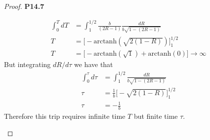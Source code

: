 \documentclass[11pt]{article}
\theoremstyle{definition}
\begin{document}
\begin{proof}{\textbf{P14.7}}
\begin{itemize}
\begin{align*}
    \int_0^T dT
    &= \int_1^{1/2} \frac{b}{(2R - 1)}\frac{dR}{b\sqrt{1 - (2R - 1)}}\\
    T &= \bigg[-\text{arctanh}(\sqrt{2(1 - R)})\bigg]_1^{1/2}\\
    T &= \bigg[-\text{arctanh}(\sqrt{1}) + \text{arctanh}(0)\bigg] \to \infty
\end{align*}
But integrating $dR/d\tau$ we have that
\begin{align*}
    \int_0^\tau d\tau
    &= \int_1^{1/2} \frac{dR}{b\sqrt{1 - (2R - 1)}}\\
    \tau &= \frac{1}{b}\bigg[-\sqrt{2(1 - R)}\bigg]_1^{1/2}\\
    \tau &= -\frac{1}{b}
\end{align*}
Therefore this trip requires infinite time $T$ but finite time $\tau$.
\end{itemize}
\end{proof}
\end{document}
